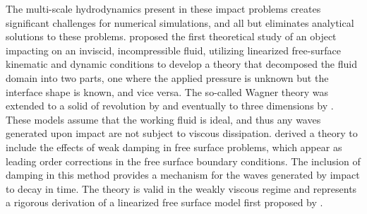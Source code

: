 \documentclass{jfm}
\begin{document}
\hspace*{1em} The multi-scale hydrodynamics present in these impact problems creates significant challenges for numerical simulations, and all but eliminates analytical solutions to these problems. \cite{wagner1932stoss} proposed the first theoretical study of an object impacting on an inviscid, incompressible fluid, utilizing linearized free-surface kinematic and dynamic conditions to develop a theory that decomposed the fluid domain into two parts, one where the applied pressure is unknown but the interface shape is known, and vice versa. The so-called Wagner theory was extended to a solid of revolution by \cite{schmieden1953aufschlag} and eventually to three dimensions by \cite{scolan2001three}. These models assume that the working fluid is ideal, and thus any waves generated upon impact are not subject to viscous dissipation. \cite{dias2008theory} derived a theory to include the effects of weak damping in free surface problems, which appear as leading order corrections in the free surface boundary conditions. The inclusion of damping in this method provides a mechanism for the waves generated by impact to decay in time. The \cite{dias2008theory} theory is valid in the weakly viscous regime and represents a rigorous derivation of a linearized free surface model first proposed by \cite{lamb1895surface}. \\
\end{document}
